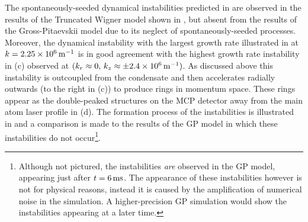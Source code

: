 The spontaneously-seeded dynamical instabilities predicted in  are observed in the results of the Truncated Wigner model shown in , but absent from the results of the Gross-Pitaevskii model due to its neglect of spontaneously-seeded processes. Moreover, the dynamical instability with the largest growth rate illustrated in  at $k=\unit[2.25\times 10^6]{m}^{-1}$ is in good agreement with the highest growth rate instability in (c) observed at $(k_r \approx 0,\, k_z \approx \pm\unit[2.4\times 10^6]{m}^{-1})$. As discussed above this instability is outcoupled from the condensate and then accelerates radially outwards (to the right in (c)) to produce rings in momentum space. These rings appear as the double-peaked structures on the MCP detector away from the main atom laser profile in (d). The formation process of the instabilities is illustrated in  and a comparison is made to the results of the GP model in which these instabilities do not occur\footnote{Although not pictured, the instabilities \emph{are} observed in the GP model, appearing just after $t=\unit[6]{ms}$. The appearance of these instabilities however is not for physical reasons, instead it is caused by the amplification of numerical noise in the simulation. A higher-precision GP simulation would show the instabilities appearing at a later time.}.

